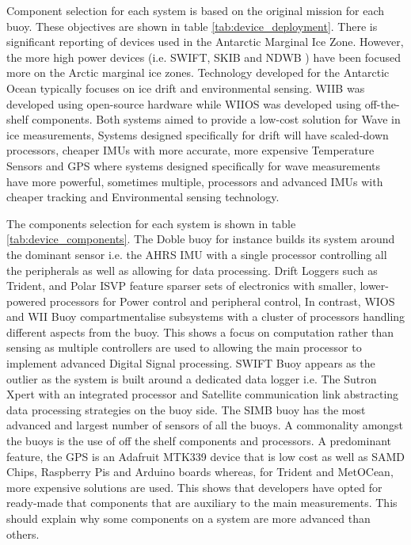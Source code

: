 Component selection for each system is based on the original mission for each buoy. These objectives are shown in  table \ref{tab:device_deployment}. There is significant reporting of devices used in the Antarctic Marginal Ice Zone. However, the more high power devices (i.e. SWIFT, SKIB and NDWB ) have been focused more on the Arctic marginal ice zones. Technology developed for the Antarctic Ocean typically focuses on ice drift and environmental sensing. WIIB was developed using open-source hardware while WIIOS was developed using off-the-shelf components. Both systems aimed to provide a low-cost solution for Wave in ice measurements,  Systems designed specifically for drift will have scaled-down processors, cheaper IMUs with more accurate, more expensive Temperature Sensors and GPS where systems designed specifically for wave measurements have more powerful, sometimes multiple, processors and advanced IMUs with cheaper tracking and Environmental sensing technology. 

The components selection for each system is shown in table \ref{tab:device_components}. The Doble buoy for instance builds its system around the dominant sensor i.e. the AHRS IMU with a single processor controlling all the peripherals as well as allowing for data processing. Drift Loggers such as Trident, and Polar ISVP feature sparser sets of electronics with smaller, lower-powered processors for Power control and peripheral control, In contrast, WIOS and WII Buoy compartmentalise subsystems with a cluster of processors handling different aspects from the buoy. This shows a focus on computation rather than sensing as multiple controllers are used to allowing the main processor to implement advanced Digital Signal processing. SWIFT Buoy appears as the outlier as the system is built around a dedicated data logger i.e. The Sutron Xpert with an integrated processor and Satellite communication link abstracting data processing strategies on the buoy side. The SIMB buoy has the most advanced and largest number of sensors of all the buoys. A commonality amongst the buoys is the use of off the shelf components and processors. A predominant feature, the GPS is an Adafruit MTK339 device that is low cost as well as SAMD Chips, Raspberry Pis and Arduino boards whereas, for Trident and MetOCean, more expensive solutions are used. This shows that developers have opted for ready-made that components that are auxiliary to the main measurements. This should explain why some components on a system are more advanced than others.

